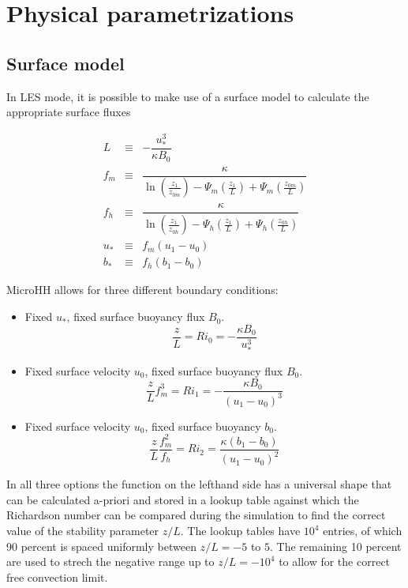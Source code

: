 \documentclass[gmd]{copernicus}
\begin{document}
\section{Physical parametrizations}
\subsection{Surface model}
In LES mode, it is possible to make use of a surface model to calculate the appropriate surface fluxes

\begin{eqnarray}
L   & \equiv & - \dfrac{u_*^3}{\kappa B_0} \\
f_m & \equiv & \dfrac{\kappa}
  { \ln{\left( \frac{z_1}{z_{0m}} \right)}
  - \Psi_m \left( \frac{z_1}{L} \right)
  + \Psi_m \left( \frac{z_{0m}}{L} \right) } \\
f_h & \equiv &
  \dfrac{\kappa}
  { \ln{\left( \frac{z_1}{z_{0h}} \right)}
  - \Psi_h \left( \frac{z_1}{L} \right)
  + \Psi_h \left( \frac{z_{0h}}{L} \right) } \\
u_* & \equiv & f_m \left( u_1 - u_0 \right) \\
b_* & \equiv & f_h \left( b_1 - b_0 \right) 
\end{eqnarray}

MicroHH allows for three different boundary conditions:
\begin{itemize}
  \item Fixed $u_*$, fixed surface buoyancy flux $B_0$.
  \begin{equation}
    \dfrac{z}{L} = Ri_0 = - \dfrac{\kappa B_0}{u_*^3}
  \end{equation}
  
  \item Fixed surface velocity $u_0$, fixed surface buoyancy flux $B_0$.
  \begin{equation}
    \dfrac{z}{L} f_m^3 = Ri_1 = - \dfrac{\kappa B_0}{ \left(u_1 - u_0 \right)^3}
  \end{equation}
  \item Fixed surface velocity $u_0$, fixed surface buoyancy $b_0$.
  \begin{equation}
    \dfrac{z}{L} \dfrac{f_m^2}{f_h} = Ri_2 = \dfrac{\kappa \left(b_1 - b_0 \right)}{ \left(u_1 - u_0 \right)^2}
  \end{equation}
\end{itemize}
In all three options the function on the lefthand side has a universal shape that can be calculated a-priori and stored in a lookup table against which the Richardson number can be compared during the simulation to find the correct value of the stability parameter $z/L$. The lookup tables have $10^4$ entries, of which 90 percent is spaced uniformly between $z/L = -5$ to $5$. The remaining 10 percent are used to strech the negative range up to $z/L = -10^4$ to allow for the correct free convection limit.
\end{document}
